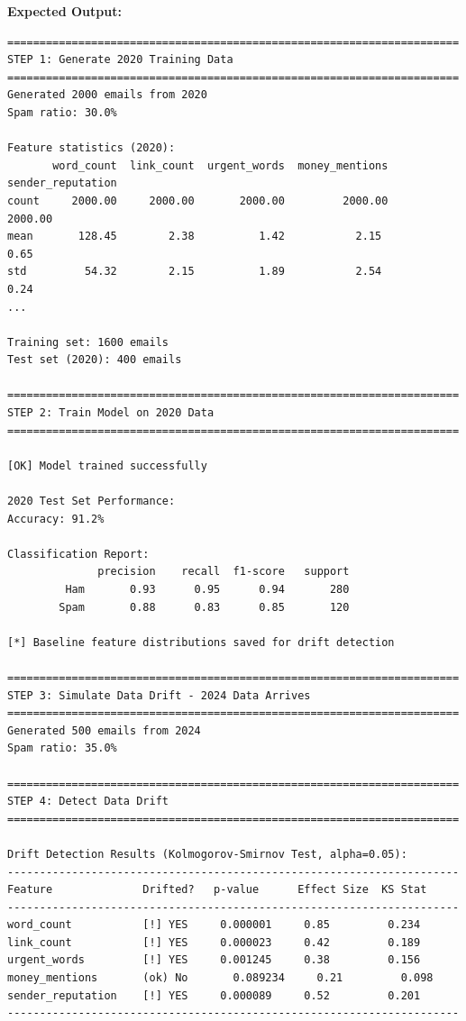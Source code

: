 \documentclass[11pt,oneside]{book}
\begin{document}
\textbf{Expected Output:}
\begin{lstlisting}
======================================================================
STEP 1: Generate 2020 Training Data
======================================================================
Generated 2000 emails from 2020
Spam ratio: 30.0%

Feature statistics (2020):
       word_count  link_count  urgent_words  money_mentions  sender_reputation
count     2000.00     2000.00       2000.00         2000.00            2000.00
mean       128.45        2.38          1.42           2.15               0.65
std         54.32        2.15          1.89           2.54               0.24
...

Training set: 1600 emails
Test set (2020): 400 emails

======================================================================
STEP 2: Train Model on 2020 Data
======================================================================

[OK] Model trained successfully

2020 Test Set Performance:
Accuracy: 91.2%

Classification Report:
              precision    recall  f1-score   support
         Ham       0.93      0.95      0.94       280
        Spam       0.88      0.83      0.85       120

[*] Baseline feature distributions saved for drift detection

======================================================================
STEP 3: Simulate Data Drift - 2024 Data Arrives
======================================================================
Generated 500 emails from 2024
Spam ratio: 35.0%

======================================================================
STEP 4: Detect Data Drift
======================================================================

Drift Detection Results (Kolmogorov-Smirnov Test, alpha=0.05):
----------------------------------------------------------------------
Feature              Drifted?   p-value      Effect Size  KS Stat
----------------------------------------------------------------------
word_count           [!] YES     0.000001     0.85         0.234
link_count           [!] YES     0.000023     0.42         0.189
urgent_words         [!] YES     0.001245     0.38         0.156
money_mentions       (ok) No       0.089234     0.21         0.098
sender_reputation    [!] YES     0.000089     0.52         0.201
----------------------------------------------------------------------


\end{lstlisting}
\end{document}
